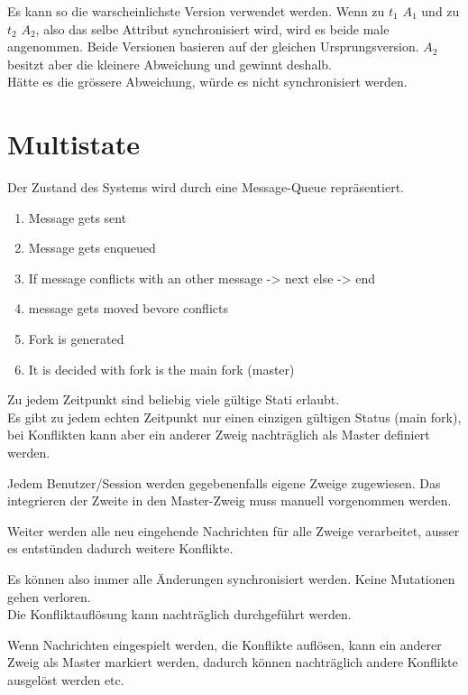 \documentclass[oneside,11pt,parskip=half,ngerman]{scrreprt}
\begin{document}
Es kann so die warscheinlichste Version verwendet werden. Wenn zu
\(t_1\) \(A_1\) und zu \(t_2\) \(A_2\), also das selbe Attribut
synchronisiert wird, wird es beide male angenommen. Beide Versionen
basieren auf der gleichen Ursprungsversion. \(A_2\) besitzt aber die
kleinere Abweichung und gewinnt deshalb.\\Hätte es die grössere
Abweichung, würde es nicht synchronisiert werden.

\section{Multistate}\label{multistate}

Der Zustand des Systems wird durch eine Message-Queue repräsentiert.

\begin{enumerate}
\def\labelenumi{\arabic{enumi}.}
\itemsep1pt\parskip0pt
\item
  Message gets sent
\item
  Message gets enqueued
\item
  If message conflicts with an other message -\textgreater{} next else
  -\textgreater{} end
\item
  message gets moved bevore conflicts
\item
  Fork is generated
\item
  It is decided with fork is the main fork (master)
\end{enumerate}

Zu jedem Zeitpunkt sind beliebig viele gültige Stati erlaubt.\\Es gibt
zu jedem echten Zeitpunkt nur einen einzigen gültigen Status (main
fork), bei Konflikten kann aber ein anderer Zweig nachträglich als
Master definiert werden.

Jedem Benutzer/Session werden gegebenenfalls eigene Zweige zugewiesen.
Das integrieren der Zweite in den Master-Zweig muss manuell vorgenommen
werden.

Weiter werden alle neu eingehende Nachrichten für alle Zweige
verarbeitet, ausser es entstünden dadurch weitere Konflikte.

Es können also immer alle Änderungen synchronisiert werden. Keine
Mutationen gehen verloren.\\Die Konfliktauflösung kann nachträglich
durchgeführt werden.

Wenn Nachrichten eingespielt werden, die Konflikte auflösen, kann ein
anderer Zweig als Master markiert werden, dadurch können nachträglich
andere Konflikte ausgelöst werden etc.
\end{document}
